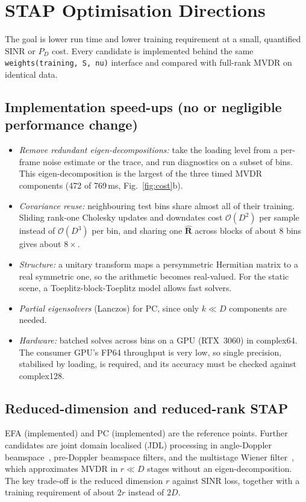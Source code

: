 \documentclass[conference]{IEEEtran}
\newcommand{\vect}[1]{\mathbf{#1}}
\begin{document}
\section{STAP Optimisation Directions}\label{sec:opt}
The goal is lower run time and lower training requirement at a small, quantified SINR or $P_D$
cost. Every candidate is implemented behind the same
\texttt{weights(training, S, nu)} interface and compared with full-rank MVDR on identical data.

\subsection{Implementation speed-ups (no or negligible performance change)}
\begin{itemize}
\item \emph{Remove redundant eigen-decompositions:} take the loading level from a per-frame noise
estimate or the trace, and run diagnostics on a subset of bins. This eigen-decomposition is the
largest of the three timed MVDR components (472 of 769\,ms, Fig.~\ref{fig:cost}b).
\item \emph{Covariance reuse:} neighbouring test bins share almost all of their training. Sliding
rank-one Cholesky updates and downdates cost $\mathcal O(D^2)$ per sample instead of
$\mathcal O(D^3)$ per bin, and sharing one $\hat{\vect R}$ across blocks of about 8 bins gives
about $8\times$.
\item \emph{Structure:} a unitary transform maps a persymmetric Hermitian matrix to a real
symmetric one, so the arithmetic becomes real-valued. For the static scene, a
Toeplitz-block-Toeplitz model allows fast solvers.
\item \emph{Partial eigensolvers} (Lanczos) for PC, since only $k\ll D$ components are needed.
\item \emph{Hardware:} batched solves across bins on a GPU (RTX~3060) in complex64. The consumer
GPU's FP64 throughput is very low, so single precision, stabilised by loading, is required, and
its accuracy must be checked against complex128.
\end{itemize}

\subsection{Reduced-dimension and reduced-rank STAP}
EFA (implemented) and PC (implemented) are the reference points. Further candidates are joint
domain localised (JDL) processing in angle-Doppler beamspace~\cite{wang1994}, pre-Doppler
beamspace filters, and the multistage Wiener filter~\cite{goldstein1998}, which approximates MVDR
in $r\ll D$ stages without an eigen-decomposition. The key trade-off is the reduced dimension $r$
against SINR loss, together with a training requirement of about $2r$ instead of $2D$.
\end{document}
